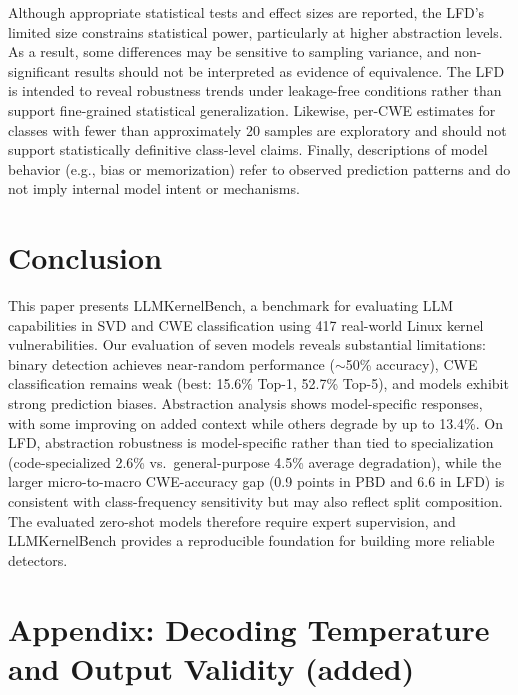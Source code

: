 \documentclass[lettersize,journal]{IEEEtran}
\begin{document}
Although appropriate statistical tests and effect sizes are reported, the LFD's limited size constrains statistical power, particularly at higher abstraction levels. As a result, some differences may be sensitive to sampling variance, and non-significant results should not be interpreted as evidence of equivalence. The LFD is intended to reveal robustness trends under leakage-free conditions rather than support fine-grained statistical generalization. Likewise, per-CWE estimates for classes with fewer than approximately 20 samples are exploratory and should not support statistically definitive class-level claims. Finally, descriptions of model behavior (e.g., bias or memorization) refer to observed prediction patterns and do not imply internal model intent or mechanisms.

\section{Conclusion}
\label{section:conclusion}

This paper presents LLMKernelBench, a benchmark for evaluating \gls{LLM} capabilities in \gls{SVD} and CWE classification using 417 real-world Linux kernel vulnerabilities. Our evaluation of seven models reveals substantial limitations: binary detection achieves near-random performance ($\sim$50\% accuracy), CWE classification remains weak (best: 15.6\% Top-1, 52.7\% Top-5), and models exhibit strong prediction biases. Abstraction analysis shows model-specific responses, with some improving on added context while others degrade by up to 13.4\%. On LFD, abstraction robustness is model-specific rather than tied to specialization (code-specialized 2.6\% vs.\ general-purpose 4.5\% average degradation), while the larger micro-to-macro CWE-accuracy gap (0.9 points in PBD and 6.6 in LFD) is consistent with class-frequency sensitivity but may also reflect split composition. The evaluated zero-shot models therefore require expert supervision, and LLMKernelBench provides a reproducible foundation for building more reliable detectors.





\section*{Appendix: Decoding Temperature and Output Validity (added)}
\label{section:appendix-abstention-temp}
\end{document}
